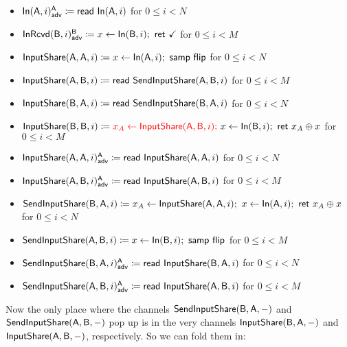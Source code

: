 \begin{itemize}
\item {\color{blue} $\LeakIn(\A,i)^\A_\adv \coloneqq \read{\In(\A,i)}$ for $0 \leq i < N$}
\item {\color{blue} $\LeakInRcvd(\B,i)^\B_\adv \coloneqq x \leftarrow \In(\B,i); \ \ret{\checkmark}$ for $0 \leq i < M$}\smallskip
\item $\InputShare(\A,\A,i) \coloneqq x \leftarrow \In(\A,i); \ \samp{\flip}$ for $0 \leq i < N$
\item $\InputShare(\A,\B,i) \coloneqq \read{\SendInputShare(\A,\B,i)}$ for $0 \leq i < M$
\item $\InputShare(\B,\A,i) \coloneqq \read{\SendInputShare(\B,\A,i)}$ for $0 \leq i < N$
\item $\InputShare(\B,\B,i) \coloneqq {\color{red} x_A \leftarrow \InputShare(\A,\B,i); \ } x \leftarrow \In(\B,i); \  \ret{x_A \oplus x}$ for $0 \leq i < M$\smallskip
\item {\color{blue} $\LeakInputShare(\A,\A,i)^\A_\adv \coloneqq \read{\InputShare(\A,\A,i)}$ for $0 \leq i < N$}
\item {\color{blue} $\LeakInputShare(\A,\B,i)^\A_\adv \coloneqq \read{\InputShare(\A,\B,i)}$ for $0 \leq i < M$}\smallskip
\item $\SendInputShare(\B,\A,i) \coloneqq x_A \leftarrow \InputShare(\A,\A,i); \ x \leftarrow \In(\A,i); \ \ret{x_A \oplus x}$ for $0 \leq i < N$
\item $\SendInputShare(\A,\B,i) \coloneqq x \leftarrow \In(\B,i); \ \samp{\flip}$ for $0 \leq i < M$\smallskip
\item {\color{red} $\LeakSendInputShare(\B,\A,i)^\A_\adv \coloneqq \read{\InputShare(\B,\A,i)}$ for $0 \leq i < N$}
\item {\color{red} $\LeakSendInputShare(\A,\B,i)^\A_\adv \coloneqq \read{\InputShare(\A,\B,i)}$ for $0 \leq i < M$}
\end{itemize}

\noindent Now the only place where the channels $\SendInputShare(\B,\A,-)$ and $\SendInputShare(\A,\B,-)$ pop up is in the very channels $\InputShare(\B,\A,-)$ and $\InputShare(\A,\B,-)$, respectively. So we can fold them in:

